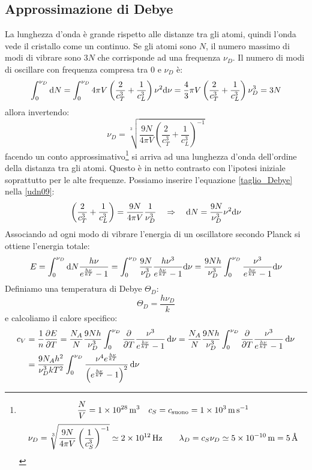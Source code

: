 \subsection{Approssimazione di Debye}
La lunghezza d'onda è grande rispetto alle distanze tra gli atomi, quindi l'onda vede il cristallo come un continuo. Se gli atomi sono $N$, il numero massimo di modi di vibrare sono $3N$ che corrisponde ad una frequenza $\nu_D$. Il numero di modi di oscillare con frequenza compresa tra $0$ e $\nu_D$ è:
\begin{equation}
	\int_0^{\nu_D}\mathrm{d} N=\int_0^{\nu_D}4\pi V\left(\frac{2}{c_T^3}+\frac{1}{c_L^3}\right)\nu^2\mathrm{d} \nu=\frac{4}{3}\pi V\left(\frac{2}{c_T^3}+\frac{1}{c_L^3}\right)\nu_D^3=3N
\end{equation}
allora invertendo:
\begin{equation}
	\nu_D=\sqrt[3]{\frac{9N}{4\pi V}\left(\frac{2}{c_T^3}+\frac{1}{c_L^3}\right)^{-1}}
	\label{taglio_Debye}
\end{equation}
facendo un conto approssimativo\footnote{
	\[
		\frac{N}{V}=\SI{1E28}{\per\meter^3}\quad c_S=c_\text{suono}=\SI{1E3}{\meter\per\second}
	\]
	\[
		\nu_D=\sqrt[3]{\frac{9N}{4\pi V}\left(\frac{1}{c_S^3}\right)^{-1}}\simeq \SI{2E12}{\hertz}
		\qquad
		\lambda_D = c_S\nu_D \simeq \SI{5E-10}{\meter}=\SI{5}{\angstrom}
	\]}
si arriva ad una lunghezza d'onda dell'ordine della distanza tra gli atomi. Questo è in netto contrasto con l'ipotesi iniziale soprattutto per le alte frequenze.
Possiamo inserire l'equazione \eqref{taglio_Debye} nella \eqref{udn09}:
\begin{equation}
	\left(\frac{2}{c_T^3}+\frac{1}{c_L^3}\right)=\frac{9N}{4\pi V}\frac{1}{\nu_D^3}\quad\Rightarrow\quad
	\mathrm{d} N=\frac{9N}{\nu_D^3}\nu^2\mathrm{d} \nu
\end{equation}
Associando ad ogni modo di vibrare l'energia di un oscillatore secondo Planck si ottiene l'energia totale:
\begin{equation}
	E=\int_0^{\nu_D}\mathrm{d} N\frac{h\nu}{e^{\frac{h\nu}{kT}}-1}=\int_0^{\nu_D}
	\frac{9N}{\nu_D^3}\frac{h\nu^3}{e^{\frac{h\nu}{kT}}-1}\mathrm{d} \nu=\frac{9Nh}{\nu_D^3}\int_0^{\nu_D}\frac{\nu^3}{e^{\frac{h\nu}{kT}}-1}\mathrm{d}\nu
\end{equation}
Definiamo una temperatura di Debye $\Theta_D$:
\begin{equation}
	\Theta_D=\frac{h\nu_D}{k}
\end{equation}
e calcoliamo il calore specifico:
\begin{equation}
	\begin{split}
		c_V&=\frac{1}{n}\frac{\partial E}{\partial T}=\frac{N_A}{N}\frac{9Nh}{\nu_D^3}\int_0^{\nu_D}\frac{\partial }{\partial T}\frac{\nu^3}{e^{\frac{h\nu}{kT}}-1}\,\mathrm{d}\nu
		=\frac{N_A}{N}\frac{9Nh}{\nu_D^3}\int_0^{\nu_D}\frac{\partial }{\partial T}\frac{\nu^3}{e^{\frac{h\nu}{kT}}-1}\,\mathrm{d}\nu\\
		&=\frac{9N_Ah^2}{\nu_D^3kT^2}\int_0^{\nu_D}\frac{\nu^4 e^{\frac{h\nu}{kT}}}{\left(e^{\frac{h\nu}{kT}}-1\right)^2}\,\mathrm{d}\nu
	\end{split}
\end{equation}
